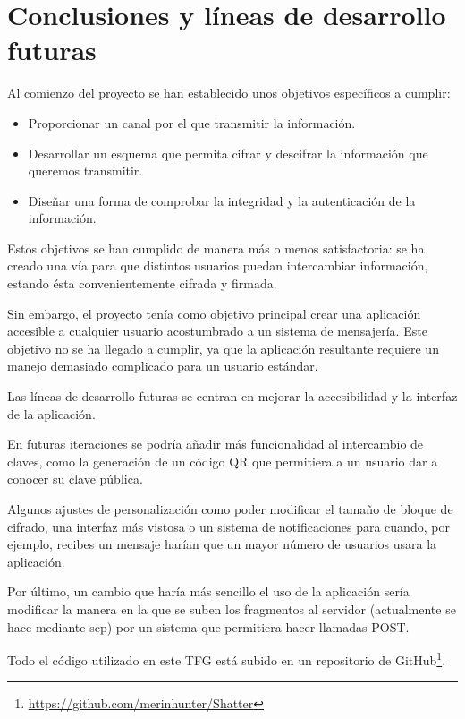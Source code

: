 
\chapter{Conclusiones y líneas de desarrollo futuras} %

\label{Chapter6} %


Al comienzo del proyecto se han establecido unos objetivos específicos a
cumplir:

\begin{itemize}
  \item Proporcionar un canal por el que transmitir la información.
  \item Desarrollar un esquema que permita cifrar y descifrar la información
  que queremos transmitir.
  \item Diseñar una forma de comprobar la integridad y la autenticación de la
  información.
\end{itemize}

Estos objetivos se han cumplido de manera más o menos satisfactoria: se ha
creado una vía para que distintos usuarios puedan intercambiar información,
estando ésta convenientemente cifrada y firmada.

Sin embargo, el proyecto tenía como objetivo principal crear una aplicación
accesible a cualquier usuario acostumbrado a un sistema de mensajería. Este
objetivo no se ha llegado a cumplir, ya que la aplicación resultante requiere
un manejo demasiado complicado para un usuario estándar.

Las líneas de desarrollo futuras se centran en mejorar la accesibilidad y la
interfaz de la aplicación.

En futuras iteraciones se podría añadir más funcionalidad al intercambio de
claves, como la generación de un código QR que permitiera a un usuario dar a
conocer su clave pública.

Algunos ajustes de personalización como poder modificar el tamaño de bloque de
cifrado, una interfaz más vistosa o un sistema de notificaciones para cuando,
por ejemplo, recibes un mensaje harían que un mayor número de usuarios usara
la aplicación.

Por último, un cambio que haría más sencillo el uso de la aplicación sería
modificar la manera en la que se suben los fragmentos al servidor (actualmente
se hace mediante scp) por un sistema que permitiera hacer llamadas POST.

Todo el código utilizado en este TFG está subido en un repositorio de
GitHub\footnote{\url{https://github.com/merinhunter/Shatter}}.
